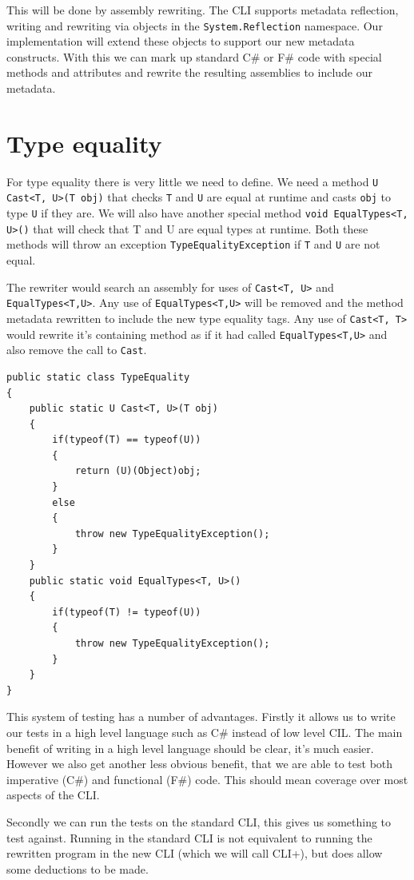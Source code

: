 \documentclass[english]{report}
\begin{document}
This will be done by assembly rewriting. The CLI supports metadata reflection,
writing and rewriting via objects in the \texttt{System.Reflection} namespace.
Our implementation will extend these objects to support our new metadata
constructs. With this we can mark up standard C\# or F\# code with special
methods and attributes and rewrite the resulting assemblies to include our
metadata.

\section{Type equality}

For type equality there is very little we need to define. We need a method
\texttt{U Cast<T, U>(T obj)} that checks \texttt{T} and \texttt{U} are equal at
runtime and casts \texttt{obj} to type \texttt{U} if they are. We will also
have another special method \texttt{void EqualTypes<T, U>()} that will check
that T and U are equal types at runtime. Both these methods will throw an
exception \texttt{TypeEqualityException} if \texttt{T} and \texttt{U} are not
equal.

The rewriter would search an assembly for uses of \texttt{Cast<T, U>} and
\texttt{EqualTypes<T,U>}. Any use of \texttt{EqualTypes<T,U>} will be removed
and the method metadata rewritten to include the new type equality tags. Any
use of \texttt{Cast<T, T>} would rewrite it's containing method as if it had
called \texttt{EqualTypes<T,U>} and also remove the call to \texttt{Cast}.

\begin{lstlisting}[caption={Cast},keywordstyle={\color{blue}},language=sharpc]
public static class TypeEquality
{
	public static U Cast<T, U>(T obj)
	{
		if(typeof(T) == typeof(U))
		{
			return (U)(Object)obj;
		}
		else
		{
			throw new TypeEqualityException();
		}
	}
	public static void EqualTypes<T, U>()
	{
		if(typeof(T) != typeof(U))
		{
			throw new TypeEqualityException();
		}
	}
}
\end{lstlisting}

This system of testing has a number of advantages. Firstly it allows us to
write our tests in a high level language such as C\# instead of low level CIL.
The main benefit of writing in a high level language should be clear, it's much
easier. However we also get another less obvious benefit, that we are able to
test both imperative (C\#) and functional (F\#) code. This should mean coverage
over most aspects of the CLI.

Secondly we can run the tests on the standard CLI, this gives us something to
test against. Running in the standard CLI is not equivalent to running the
rewritten program in the new CLI (which we will call CLI+), but does allow some
deductions to be made.
\end{document}
